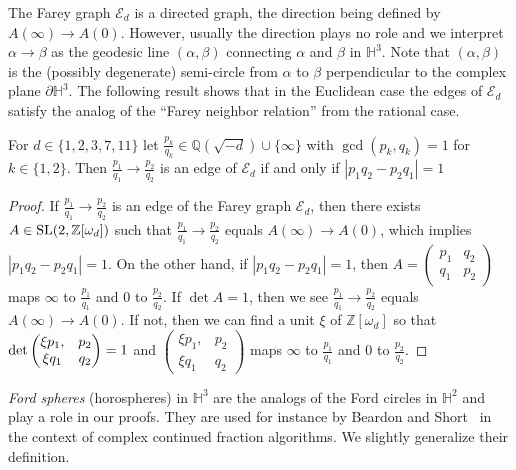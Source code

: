 \documentclass[graybox]{svmult}
\begin{document}
The Farey graph $\mathcal E_{d}$ is a directed graph, the direction being defined by $A(\infty)\to A(0)$. However, usually the direction plays no role and   we interpret $\alpha \to \beta$ as the geodesic line $(\alpha,\beta)$ connecting $\alpha$  and $\beta$ in $\mathbb H^{3}$. Note that $(\alpha,\beta)$ is the (possibly degenerate) semi-circle from $\alpha$ to $\beta$ perpendicular to the complex plane $\partial\mathbb H^{3}$. The following result shows that in the Euclidean case the edges of $\mathcal E_{d}$ satisfy the analog of the ``Farey neighbor relation'' from the rational case.

\begin{proposition}\label{prop:EdCrit}
For $d\in\{1,2,3,7,11\}$ let $\tfrac{p_{k}}{q_{k}} \in \mathbb Q(\sqrt{-d}) \cup \{\infty\}$ with $\gcd(p_{k}, q_{k})=1$ for $k\in\{1,2\}$.  Then 
$\tfrac{p_{1}}{q_{1}}\to \tfrac{p_{2}}{q_{2}}$ is an edge of $\mathcal E_{d}$ if and only if $|p_{1}q_{2} - p_{2}q_{1}| = 1$ 
\end{proposition}
\begin{proof} 
If $\tfrac{p_{1}}{q_{1}}\to \tfrac{p_{2}}{q_{2}}$ is an edge of the Farey graph $\mathcal{E}_d$, then there exists 
$A \in {\rm SL}(2, \mathbb{Z}[\omega_d])$ such that $\tfrac{p_{1}}{q_{1}}\to \tfrac{p_{2}}{q_{2}}$ equals $A(\infty) \to  A(0)$, 
which implies $|p_{1}q_{2} - p_{2}q_{1}| = 1$.  On the other hand, 
if $|p_{1}q_{2} - p_{2}q_{1}| = 1$, then $A = \begin{pmatrix} p_{1} & q_{2} \\ q_{1} & p_{2} \end{pmatrix}$ maps $\infty$ to 
$\tfrac{p_{1}}{q_{1}}$ and $0$ to $\tfrac{p_{2}}{q_{2}}$.  If $\det A = 1$, then we see $\tfrac{p_{1}}{q_{1}}\to \tfrac{p_{2}}{q_{2}}$ equals $A(\infty) \to  A(0)$.  If not, then we can find a unit $\xi$ of $\mathbb{Z}[\omega_d]$ so that 
${\rm det} \begin{pmatrix}\xi p_{1}, & p_{2} \\ \xi q_{1} & q_{2} \end{pmatrix} = 1$ and 
$\begin{pmatrix}\xi p_{1}, & p_{2} \\ \xi q_{1} & q_{2} \end{pmatrix}$ maps $\infty$ to $\tfrac{p_{1}}{q_{1}}$ and $0$ to $\tfrac{p_{2}}{q_{2}}$. 
\end{proof}     

{\em Ford spheres} (horospheres) in $\mathbb{H}^3$ are the analogs of the Ford circles in $\mathbb{H}^2$ and play a role in our proofs. They are used for instance by Beardon and Short~\cite{Beardon-Short:14} in the context of complex continued fraction algorithms. We slightly generalize their definition.
\end{document}
